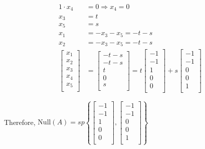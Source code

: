 \documentclass[12pt]{article}
\theoremstyle{plain}
\theoremstyle{remark}
\theoremstyle{definition}
\begin{document}
\begin{align*}
1 \cdot x_{4} &= 0 \Rightarrow x_{4} = 0 \\
x_{3} &= t \\
x_{5} &= s \\
x_{1} &= - x_{3} - x_{5} = - t - s \\
x_{2} &= - x_{3} - x_{5} = - t - s \\
\begin{bmatrix}x_{1} \\x_{2} \\x_{3} \\x_{4} \\x_{5} \\\end{bmatrix} &= \begin{bmatrix} - t - s \\ - t - s \\t \\0 \\s \\\end{bmatrix} = t\begin{bmatrix} - 1 \\ - 1 \\1 \\0 \\0 \\\end{bmatrix} + s\begin{bmatrix} - 1 \\ - 1 \\0 \\0 \\1 \\\end{bmatrix}
\end{align*}


Therefore, \(\text{Null}(A) = sp\left\{ \begin{bmatrix}
 - 1 \\
 - 1 \\
1 \\
0 \\
0 \\
\end{bmatrix},\begin{bmatrix}
 - 1 \\
 - 1 \\
0 \\
0 \\
1 \\
\end{bmatrix} \right\}\)
\end{document}
